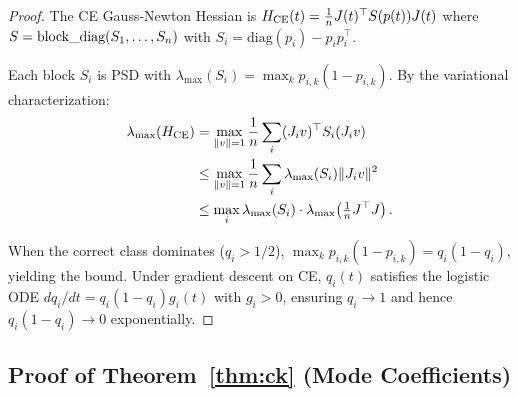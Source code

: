 \begin{proof}
The CE Gauss-Newton Hessian is $H_{\text{CE}}(t) = \frac{1}{n}J(t)^\top S(p(t)) J(t)$ where $S = \text{block\_diag}(S_1,\ldots,S_n)$ with $S_i = \text{diag}(p_i) - p_ip_i^\top$.

Each block $S_i$ is PSD with $\lambda_{\max}(S_i) = \max_k p_{i,k}(1-p_{i,k})$. By the variational characterization:
\begin{align}
    \lambda_{\max}(H_{\text{CE}}) &= \max_{\|v\|=1} \frac{1}{n}\sum_i (J_i v)^\top S_i(J_i v) \\
    &\leq \max_{\|v\|=1} \frac{1}{n}\sum_i \lambda_{\max}(S_i)\|J_i v\|^2 \\
    &\leq \max_i \lambda_{\max}(S_i) \cdot \lambda_{\max}\!\left(\tfrac{1}{n}J^\top J\right).
\end{align}

When the correct class dominates ($q_i > 1/2$), $\max_k p_{i,k}(1-p_{i,k}) = q_i(1-q_i)$, yielding the bound. Under gradient descent on CE, $q_i(t)$ satisfies the logistic ODE $dq_i/dt = q_i(1-q_i)g_i(t)$ with $g_i > 0$, ensuring $q_i \to 1$ and hence $q_i(1-q_i) \to 0$ exponentially.
\end{proof}

\subsection{Proof of Theorem~\ref{thm:ck} (Mode Coefficients)}
\label{app:proof:ck}


